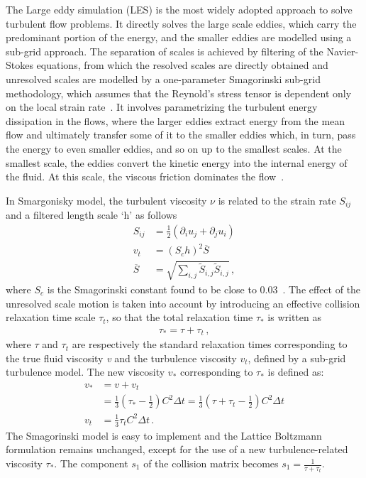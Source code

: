 The Large eddy simulation (LES) is the most widely adopted approach to solve 
turbulent flow problems. It directly solves the large scale eddies, which carry 
the predominant portion of the energy, and the smaller eddies are modelled 
using a sub-grid approach. The separation of scales is achieved by filtering of 
the Navier-Stokes equations, from which the resolved scales are directly 
obtained and unresolved scales are modelled by a one-parameter Smagorinski 
sub-grid methodology, which assumes that the Reynold's stress tensor is 
dependent only on the local strain rate~\citep{Smagorinsky1963}. It involves 
parametrizing the turbulent energy dissipation in the flows, where the larger 
eddies extract energy from the mean flow and ultimately transfer some of it to 
the smaller eddies which, in turn, pass the energy to even smaller eddies, and 
so on up to the smallest scales. At the smallest scale, the eddies convert the 
kinetic energy into the internal energy of the fluid. At this scale, the 
viscous friction dominates the flow~\citep{Frisch1995}.

In Smargonisky model, the turbulent viscosity $\nu$ is related to the strain 
rate $S_{ij}$ and a filtered length scale `h' as follows
%
\begin{align}
S_{ij} & = \frac{1}{2}(\partial_i u_j + \partial_j u_i) \\
\mathit{v}_{\mathit{t}} & = (\mathit{S}_{c}\mathit{h})^{2}\overline{S} \\
\overline{S} & =  
\sqrt{\sum\limits_{\mathit{i,j}}{\tilde{S}_{\mathit{i,j}}\tilde{S}_{\mathit{i,j}}}}\,,
\end{align}
%
\noindent where $\mathit{S}_{c}$ is the Smagorinski constant found to be close 
to 0.03~\citep{yu2005}. 
%
The effect of the unresolved scale motion is taken into account by introducing 
an effective collision relaxation time scale $\tau_{t}$, so that the total 
relaxation time $\tau_{*}$ is written as
%
\begin{align}
\tau_{*}=\tau + \tau_{t}\,,
\end{align} 
%
\noindent where $\tau$ and $\tau_{t}$ are respectively the standard relaxation 
times 
corresponding to the true fluid viscosity \textit{v} and the turbulence 
viscosity $\mathit{v}_{\mathit{t}}$, defined by a sub-grid turbulence model. 
The new viscosity $\mathit{v}_{*}$ corresponding to $\tau_{*}$ is defined as:
%
\begin{align}
\mathit{v}_{*} & 
=\mathit{v}+\mathit{v}_{\mathit{t}} \nonumber \\
	& =\frac{1}{3}(\tau_{*}-\frac{1}{2})
\mathit{C}^{2} \Delta \mathit{t} 
=\frac{1}{3}(\tau+\tau_{t}-\frac{1}{2})\mathit{C}^{2} \Delta \mathit{t}  \\
\mathit{v}_{\mathit{t}} & =\frac{1}{3}\tau_{\mathit{t}}\mathit{C}^{2} \Delta 
\textit{t} \,.
\end{align} 
%
The Smagorinski model is easy to implement and the Lattice Boltzmann 
formulation remains unchanged, except for the use of a new turbulence-related 
viscosity $\tau_{*}$. The component $s_1$ of the collision matrix becomes $s_1 
= \frac{1}{\tau+\tau_t}$.


